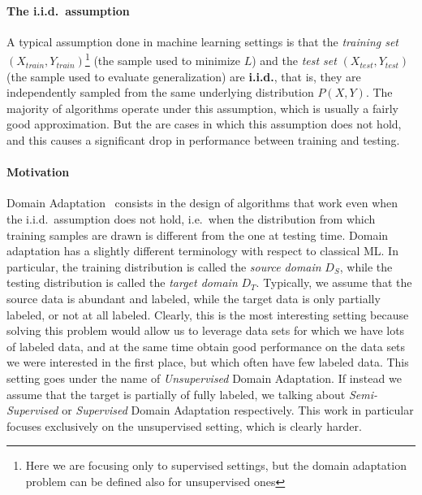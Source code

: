 \documentclass[../main.tex]{subfiles}
\begin{document}
    \paragraph{The i.i.d.\ assumption}
    A typical assumption done in machine learning settings is that the \textit{training set}
    $( X_{train}, Y_{train} )$\footnote{Here we are focusing only to supervised settings, but the domain adaptation problem
    can be defined also for unsupervised ones} (the sample used to minimize $L$) and the \textit{test set} $( X_{test}, Y_{test} )$
    (the sample used to evaluate generalization) are \textbf{i.i.d.}, that is, they are independently sampled from the same
    underlying distribution $P(X, Y)$. The majority of algorithms operate under this assumption, which is usually a fairly good
    approximation. But the are cases in which this assumption does not hold, and this causes a significant drop in performance between
    training and testing.
    \paragraph{Motivation}
    Domain Adaptation~\cite{domain-adaptation-review} consists in the design of algorithms that work even when the i.i.d.\
    assumption does not hold, i.e.\ when the distribution from which training samples are drawn is different from the
    one at testing time.
    Domain adaptation has a slightly different terminology with respect to classical ML\@. In particular, the training distribution
    is called the \textit{source domain} $D_{S}$, while the testing distribution is called the \textit{target domain} $D_{T}$.
    Typically, we assume that the source data is abundant and labeled, while the target data is only partially labeled, or not at all
    labeled. Clearly, this is the most interesting setting because solving this problem would allow us to leverage data sets for
    which we have lots of labeled data, and at the same time obtain good performance on the data sets we were interested in the first
    place, but which often have few labeled data. This setting goes under the name of \textit{Unsupervised} Domain Adaptation. If instead
    we assume that the target is partially of fully labeled, we talking about \textit{Semi-Supervised} or \textit{Supervised} Domain
    Adaptation respectively. This work in particular focuses exclusively on the unsupervised setting, which is clearly harder.
\end{document}
